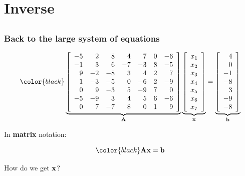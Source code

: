 \documentclass[compress]{beamer}
\newcommand{\black}[1]{{\color{black}#1}}
\renewcommand{\emph}[1]{\textbf{\black{#1}}}
\newcommand{\beq}[1]{\[\black{#1}\]}
\begin{document}
\section{Inverse}
\subsection*{}


\begin{frame}
\frametitle{Back to the large system of equations}

\beq{
\underbrace{\left[
\begin{array}{rrrrrrrr}
-5 & 2 & 8 & 4 & 7 & 0 & -6\\
-1 & 3 & 6 & -7 & -3 & 8 & -5\\
9 & -2 & -8 & 3 & 4 & 2 & 7\\
1 & -3 & -5 & 0 & -6 & 2 & -9\\
0 & 9 & -3 & 5 & -9 & 7 & 0\\
-5 & -9 & 3 & 4 & 5 & 6 & -6\\
0 & 7 & -7 & 8 & 0 & 1 & 9\\
\end{array}\right]}_{\A}
\underbrace{\left[
\begin{array}{r}
     x_1\\
     x_2\\
     x_3\\
    x_4\\
    x_5\\
    x_6\\
    x_7\\
\end{array}
\right]}_{\x}
=\underbrace{\left[
\begin{array}{r}
     4\\
     0\\
    -1\\
    -8\\
     3\\
    -9\\
    -8\\
\end{array}
\right]}_{\b}
}

In \emph{matrix} notation:

\beq{
\A\x = \b
}

\alert{How do we get ${\mathbf x}$?}

\end{frame}

\end{document}
